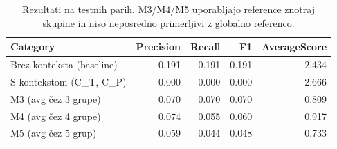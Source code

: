 \begin{table}[h]
\centering
\caption{Rezultati na testnih parih. M3/M4/M5 uporabljajo reference znotraj skupine in niso neposredno primerljivi z globalno referenco.}
\label{tab:table_4_5}
\begin{tabular}{lrrrr}
\toprule
Category & Precision & Recall & F1 & AverageScore \\
\midrule
Brez konteksta (baseline) & 0.191 & 0.191 & 0.191 & 2.434 \\
S kontekstom (C\_T, C\_P) & 0.000 & 0.000 & 0.000 & 2.666 \\
M3 (avg čez 3 grupe) & 0.070 & 0.070 & 0.070 & 0.809 \\
M4 (avg čez 4 grupe) & 0.074 & 0.055 & 0.060 & 0.917 \\
M5 (avg čez 5 grup) & 0.059 & 0.044 & 0.048 & 0.733 \\
\bottomrule
\end{tabular}

\end{table}
